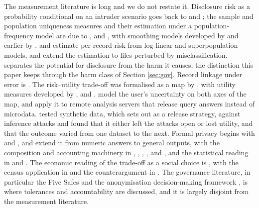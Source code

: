 \documentclass[11pt,a4paper]{article}
\theoremstyle{plain}
\theoremstyle{definition}
\begin{document}
The measurement literature is long and we do not restate it. Disclosure risk as
a probability conditional on an intruder scenario goes back to
\citet{duncan1989} and \citet{elliot1999}; the sample and population uniqueness
measures and their estimation under a population-frequency model are due to
\citet{skinner2002}, \citet{reiter2005} and \citet{skinner2008}, with smoothing
models developed by \citet{rinott2006} and earlier by \citet{bethlehem1990}.
\citet{elamir2004} and \citet{franconi2004} estimate per-record risk from
log-linear and superpopulation models, and \citet{shlomoskinner2010} extend the
estimation to files perturbed by misclassification. \citet{skinner2012}
separates the potential for disclosure from the harm it causes, the distinction
this paper keeps through the harm class of Section \ref{sec:gov}.
Record linkage under error is \citet{fellegi1969}. The risk--utility trade-off
was formalised as a map by \citet{duncan2001}, with utility measures developed
by \citet{karr2006}, \citet{woo2009} and \citet{snoke2018}.
\citet{trottini2002} model the user's uncertainty on both axes of the map, and
\citet{gomatam2005} apply it to remote analysis servers that release query
answers instead of microdata. \citet{stadler2022} tested synthetic data, which
\citet{drechsler2011} sets out as a release strategy, against inference attacks
and found that it either left the attacks open or lost utility, and that the
outcome varied from one dataset to the next. Formal privacy
begins with \citet{dinur2003} and \citet{dwork2006a,dwork2006b}, and
\citet{mcsherry2007} extend it from numeric answers to general outputs, with the
composition and accounting machinery in \citet{dwork2010}, \citet{kairouz2017},
\citet{dwork2014},
\citet{bun2016}, \citet{mironov2017} and \citet{dong2022}, and the statistical
reading in \citet{wasserman2010} and \citet{duchi2018}. The economic reading of
the trade-off as a social choice is \citet{abowd2019}, with the census
application in \citet{abowd2022} and the counterargument in \citet{hotz2022}.
The governance literature, in particular the Five Safes
\citep{desai2016} and the anonymisation decision-making framework
\citep{elliot2020}, is where tolerances and accountability are discussed, and it
is largely disjoint from the measurement literature.
\end{document}
